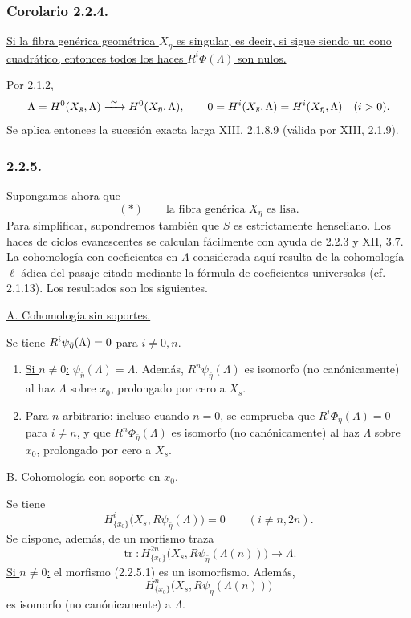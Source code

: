 \subsubsection*{Corolario 2.2.4.}
\underline{Si la fibra genérica geométrica $X_{\bar\eta}$ es singular,
es decir, si sigue siendo un cono cuadrático, entonces todos los haces
$R^i\Phi(\Lambda)$ son nulos.}

Por 2.1.2,
\[
\Lambda=H^{\sisi{o}{0}}(X_{\bar s},\Lambda)
 \xrightarrow{\ \sim\ }H^{\sisi{o}{0}}(X_{\bar\eta},\Lambda),
\qquad
0=H^i(X_{\bar s},\Lambda)=H^i(X_{\bar\eta},\Lambda)
\quad(i>0).
\]
Se aplica entonces la sucesión exacta larga XIII, 2.1.8.9 (válida por
XIII, 2.1.9).

\subsubsection*{2.2.5.}
Supongamos ahora que
\[
(*)\qquad\text{la fibra genérica $X_\eta$ es lisa.}
\]
Para simplificar, supondremos también que $S$ es estrictamente
henseliano. Los haces de ciclos evanescentes se calculan fácilmente con
ayuda de 2.2.3 y XII, 3.7. La cohomología con coeficientes en $\Lambda$
considerada aquí resulta de la cohomología $\ell$-ádica del pasaje
citado mediante la fórmula de coeficientes universales (cf. 2.1.13).
Los resultados son los siguientes.

\medskip
\noindent\underline{A. Cohomología sin soportes.}

Se tiene $R^i\psi_{\sisi{\eta}{\bar\eta}}(\Lambda)=0$ para
$i\ne0,n$.

\pageoriginale

\begin{enumerate}
\item[1)] \underline{Si $n\ne0$:}
$\psi_{\bar\eta}(\Lambda)=\Lambda$. Además,
$R^n\psi_{\bar\eta}(\Lambda)$ es isomorfo (no canónicamente) al haz
$\Lambda$ sobre $x_0$, prolongado por cero a $X_s$.

\item[2)] \underline{Para $n$ arbitrario:}
incluso cuando $n=0$, se comprueba que
$R^i\Phi_{\bar\eta}(\Lambda)=0$ para $i\ne n$, y que
$R^n\Phi_{\bar\eta}(\Lambda)$ es isomorfo (no canónicamente) al haz
$\Lambda$ sobre $x_0$, prolongado por cero a $X_s$.
\end{enumerate}

\medskip
\noindent\underline{B. Cohomología con soporte en $x_0$.}

Se tiene
\[
H^i_{\{x_0\}}\bigl(X_s,R\psi_{\bar\eta}(\Lambda)\bigr)=0
\qquad(i\ne n,2n).
\]
Se dispone, además, de un morfismo traza
\begin{equation}\tag{2.2.5.1}
\operatorname{tr}:
H^{2n}_{\{x_0\}}\bigl(X_s,R\psi_{\bar\eta}(\Lambda(n))\bigr)
\longrightarrow\Lambda.
\end{equation}
\underline{Si $n\ne0$:} el morfismo (2.2.5.1) es un isomorfismo.
Además,
\[
H^n_{\{x_0\}}\bigl(X_s,R\psi_{\bar\eta}(\Lambda(n))\bigr)
\]
es isomorfo (no canónicamente) a $\Lambda$.

